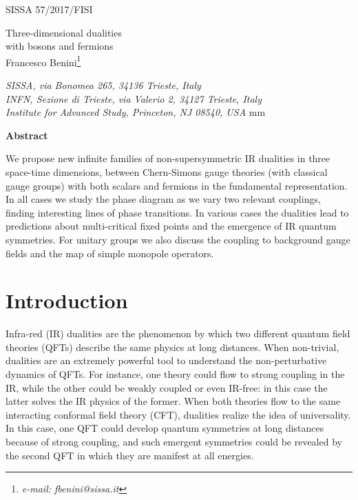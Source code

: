 \documentclass[a4paper, 12pt]{article}
\renewcommand{\baselinestretch}{1.2}
\numberwithin{equation}{section}
\begin{document}
\thispagestyle{empty}
\begin{flushright}
SISSA  57/2017/FISI
\end{flushright}
\vspace{10mm}
\begin{center}
{\huge  Three-dimensional dualities \\[.5em] with bosons and fermions} 
\\[15mm]
{Francesco Benini}\footnote{\it e-mail: fbenini@sissa.it}
\vskip 6mm
 
\bigskip
{\it
SISSA, via Bonomea 265, 34136 Trieste, Italy \\[.5em]
INFN, Sezione di Trieste, via Valerio 2, 34127 Trieste, Italy \\[.5em]
Institute for Advanced Study, Princeton, NJ 08540, USA
}
 mm

\bigskip
\bigskip

{\bf Abstract}\\[5mm]
{\parbox{14cm}{\hspace{5mm}

We propose new infinite families of non-supersymmetric IR dualities in three space-time dimensions, between Chern-Simons gauge theories (with classical gauge groups) with both scalars and fermions in the fundamental representation. In all cases we study the phase diagram as we vary two relevant couplings, finding interesting lines of phase transitions. In various cases the dualities lead to predictions about multi-critical fixed points and the emergence of IR quantum symmetries. For unitary groups we also discuss the coupling to background gauge fields and the map of simple monopole operators.
}
}
\end{center}
\newpage
{}
\setcounter{page}{1}
\setcounter{footnote}{0}
\renewcommand{\thefootnote}{\arabic{footnote}}

{\renewcommand{\baselinestretch}{1} \parskip=0pt
\setcounter{tocdepth}{2}
\tableofcontents}





\section{Introduction}

Infra-red (IR) dualities are the phenomenon by which two different quantum field theories (QFTs) describe the same physics at long distances. When non-trivial, dualities are an extremely powerful tool to understand the non-perturbative dynamics of QFTs. For instance, one theory could flow to strong coupling in the IR, while the other could be weakly coupled or even IR-free: in this case the latter solves the IR physics of the former. When both theories flow to the same interacting conformal field theory (CFT), dualities realize the idea of universality. In this case, one QFT could develop quantum symmetries at long distances because of strong coupling, and such emergent symmetries could be revealed by the second QFT in which they are manifest at all energies.
\end{document}
